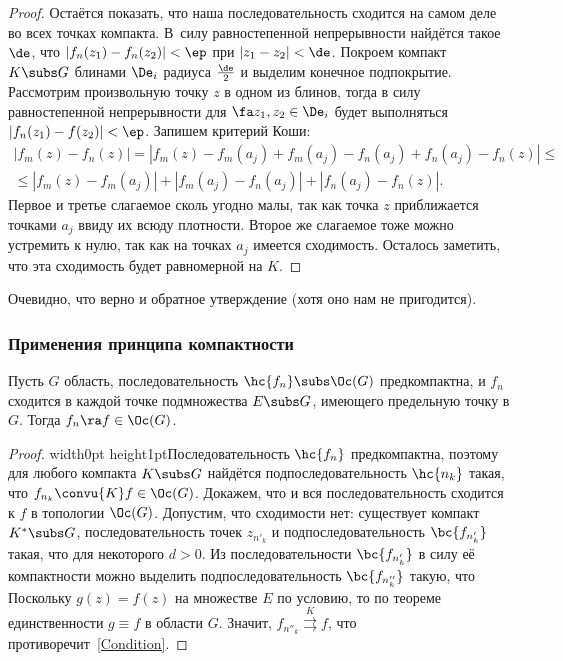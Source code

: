 \documentclass[a4paper]{article}
\def\marksign{$\maltese$}
\newcommand{\markr}{\vrule width0pt height1pt\vadjust{\vbox to 0pt{\vss\hbox to \textwidth{\hfil\raise.1pc\hbox to 0pt{\hskip.75em\marksign\hss}}}}}
\begin{document}
\begin{theorem}
\begin{proof}
Остаётся показать, что наша последовательность сходится на самом деле во всех точках компакта. В~силу
равностепенной непрерывности найдётся такое $\de$, что $|f_n(z_1)-f_n(z_2)|<\ep$ при
$|z_1-z_2|<\de$. Покроем компакт $K \subs G$ блинами $\De_i$ радиуса $\frac{\de}{2}$ и выделим конечное
подпокрытие. Рассмотрим произвольную точку $z$ в одном из блинов, тогда в силу равностепенной непрерывности
для $\fa z_1,z_2\in \De_i$ будет выполняться $|f_n(z_1)-f(z_2)|<\ep$. Запишем критерий Коши:
\begin{multline*}
|f_m(z)-f_n(z)| = |f_m(z) - f_m(a_j) + f_m(a_j) - f_n(a_j) + f_n(a_j) - f_n(z)|\le\\\le
 |f_m(z) - f_m(a_j)| + |f_m(a_j) - f_n(a_j)| + |f_n(a_j) - f_n(z)|.
\end{multline*}
Первое и третье слагаемое сколь угодно малы, так как точка $z$ приближается точками $a_j$ ввиду их всюду плотности.
Второе же слагаемое тоже можно устремить к нулю, так как на точках $a_j$ имеется сходимость. Осталось заметить, что
эта сходимость будет равномерной на $K$.
\end{proof}
\begin{note}
Очевидно, что верно и обратное утверждение (хотя оно нам не пригодится).
\end{note}

\subsubsection{Применения принципа компактности}

\begin{theorem}[Витали]
Пусть $G$ область, последовательность $\hc{f_n}\subs \Oc(G)$ предкомпактна, и $f_n$ сходится
в каждой точке подмножества $E\subs G$, имеющего предельную точку в $G$.
Тогда $f_n \ra f\in \Oc(G)$.
\end{theorem}
\begin{proof}
\markr Последовательность $\hc{f_n}$  предкомпактна, поэтому для любого компакта $K \subs G$ найдётся подпоследовательность
$\hc{n_k}$ такая, что $f_{n_k} \convu{K} f\in \Oc(G)$. Докажем, что и вся последовательность сходится
к $f$ в топологии $\Oc(G)$. Допустим, что сходимости нет: существует компакт $K^* \subs G$,
последовательность точек $z_{n'_k}$ и подпоследовательность $\bc{f_{n'_k}}$ такая, что
для некоторого $d>0$. Из последовательности $\bc{f_{n'_k}}$ в силу её компактности можно выделить
подпоследовательность $\bc{f_{n''_k}}$ такую, что
Поскольку $g(z)=f(z)$ на множестве $E$ по условию, то по теореме единственности
$g \equiv f$ в области $G$. Значит, $f_{n''_k} \stackrel{K}{\rightrightarrows}f$, что противоречит~\eqref{Condition}.
\end{proof}


\end{theorem}
\end{document}

